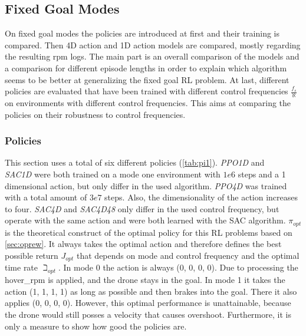 \subsection{Fixed Goal Modes}
On fixed goal modes the policies are introduced at first and their training is compared. 
Then 4D action and 1D action models are compared, mostly regarding the resulting rpm logs. 
The main part is an overall comparison of the models and a comparison for different episode lengths in order 
to explain which algorithm seems to be better at generalizing the fixed goal RL problem. 
At last, different policies are evaluated that have been trained with different control frequencies $\frac{f_s}{\aleph}$ on environments with different control frequencies. 
This aims at comparing the policies on their robustness to control frequencies.

\subsubsection{Policies}
This section uses a total of six different policies (\cref{tab:pi1}).
\emph{PPO1D} and \\ \emph{SAC1D} were both trained on a mode one 
environment with $1e6$ steps and a 1 dimensional action, 
but only differ in the used algorithm.
 \emph{PPO4D} was trained with a total amount of $3e7$ steps. 
 Also, the dimensionality of the action increases to four.
 \emph{SAC4D} and \emph{SAC4D48} only differ in the used control frequency, but operate with the same action and were both learned with the SAC algorithm.
 \emph{$\pi_{opt}$} is the theoretical construct of the optimal policy for this RL problems based on \cref{sec:oprew}. 
 It always takes the optimal action and therefore defines the best possible return $J_{opt}$ that depends on mode and control frequency and the optimal time rate $\beth_{opt}$.
 In mode 0 the action is always (0, 0, 0, 0). 
 Due to processing the hover\_rpm is applied, and the drone stays in the goal. 
 In mode 1 it takes the action (1, 1, 1, 1) as long as possible and then brakes into the goal. 
 There it also applies (0, 0, 0, 0). 
 However, this optimal performance is unattainable, because the drone would still posses a velocity that causes overshoot.
 Furthermore, it is only a measure to show how good the policies are.
 
